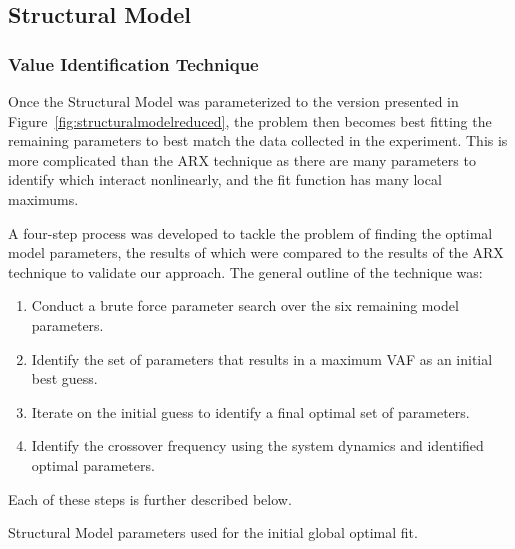 
\subsection{Structural Model}
\subsubsection{Value Identification Technique}
Once the Structural Model was parameterized to the version presented in Figure~\ref{fig:structuralmodelreduced}, the problem then becomes best fitting the remaining parameters to best match the data collected in the experiment.
This is more complicated than the ARX technique as there are many parameters to identify which interact nonlinearly, and the fit function has many local maximums.

A four-step process was developed to tackle the problem of finding the optimal model parameters, the results of which were compared to the results of the ARX technique to validate our approach.
The general outline of the technique was:
\begin{enumerate}
    \item Conduct a brute force parameter search over the six remaining model parameters.
    \item Identify the set of parameters that results in a maximum VAF as an initial best guess.
    \item Iterate on the initial guess to identify a final optimal set of parameters.
    \item Identify the crossover frequency using the system dynamics and identified optimal parameters.
\end{enumerate}
Each of these steps is further described below.

\begin{table}[tb]
    \centering
    \caption[Structural Model parameters used for the initial global optimal fit]{Structural Model parameters used for the initial global optimal fit.}
    \label{table:structuralmodelparameters}
\end{table}

